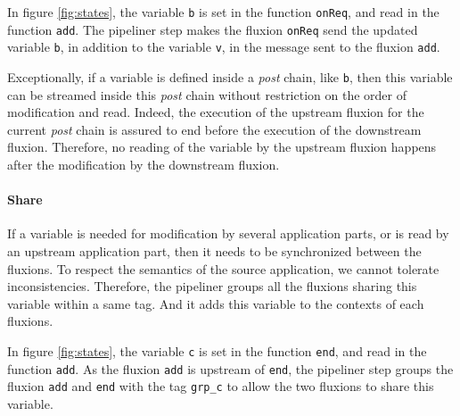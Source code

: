 In figure \ref{fig:states}, the variable \texttt{b} is set in the function \texttt{onReq}, and read in the function \texttt{add}.
The pipeliner step makes the fluxion \texttt{onReq} send the updated variable \texttt{b}, in addition to the variable \texttt{v}, in the message sent to the fluxion \texttt{add}.

Exceptionally, if a variable is defined inside a \textit{post} chain, like \texttt{b}, then this variable can be streamed inside this \textit{post} chain without restriction on the order of modification and read.
Indeed, the execution of the upstream fluxion for the current \textit{post} chain is assured to end before the execution of the downstream fluxion.
Therefore, no reading of the variable by the upstream fluxion happens after the modification by the downstream fluxion.



\paragraph{Share}
If a variable is needed for modification by several application parts, or is read by an upstream application part, then it needs to be synchronized between the fluxions.
To respect the semantics of the source application, we cannot tolerate inconsistencies.
Therefore, the pipeliner groups all the fluxions sharing this variable within a same tag.
And it adds this variable to the contexts of each fluxions.

In figure \ref{fig:states}, the variable \texttt{c} is set in the function \texttt{end}, and read in the function \texttt{add}.
As the fluxion \texttt{add} is upstream of \texttt{end}, the pipeliner step groups the fluxion \texttt{add} and \texttt{end} with the tag \texttt{grp\_c} to allow the two fluxions to share this variable.

